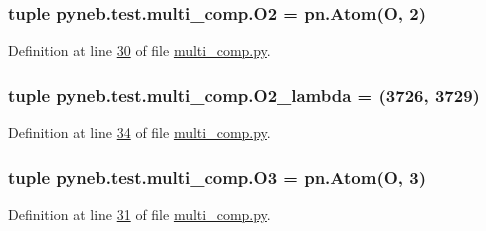 \hypertarget{namespacepyneb_1_1test_1_1multi__comp_a823eed65ec2dc8d8c130674f0fed04c7}{}
\subsubsection[{O2}]{\setlength{\rightskip}{0pt plus 5cm}tuple pyneb.\+test.\+multi\+\_\+comp.\+O2 = pn.\+Atom(\textquotesingle{}O\textquotesingle{}, 2)}\label{namespacepyneb_1_1test_1_1multi__comp_a823eed65ec2dc8d8c130674f0fed04c7}


Definition at line \hyperlink{multi__comp_8py_source_l00030}{30} of file \hyperlink{multi__comp_8py_source}{multi\+\_\+comp.\+py}.

\hypertarget{namespacepyneb_1_1test_1_1multi__comp_a1f68d28fa47ec3f8062f76c21d772d6e}{}
\subsubsection[{O2\+\_\+lambda}]{\setlength{\rightskip}{0pt plus 5cm}tuple pyneb.\+test.\+multi\+\_\+comp.\+O2\+\_\+lambda = (3726, 3729)}\label{namespacepyneb_1_1test_1_1multi__comp_a1f68d28fa47ec3f8062f76c21d772d6e}


Definition at line \hyperlink{multi__comp_8py_source_l00034}{34} of file \hyperlink{multi__comp_8py_source}{multi\+\_\+comp.\+py}.

\hypertarget{namespacepyneb_1_1test_1_1multi__comp_ac49b06657ba235ae0972deab3dd715ab}{}
\subsubsection[{O3}]{\setlength{\rightskip}{0pt plus 5cm}tuple pyneb.\+test.\+multi\+\_\+comp.\+O3 = pn.\+Atom(\textquotesingle{}O\textquotesingle{}, 3)}\label{namespacepyneb_1_1test_1_1multi__comp_ac49b06657ba235ae0972deab3dd715ab}


Definition at line \hyperlink{multi__comp_8py_source_l00031}{31} of file \hyperlink{multi__comp_8py_source}{multi\+\_\+comp.\+py}.

